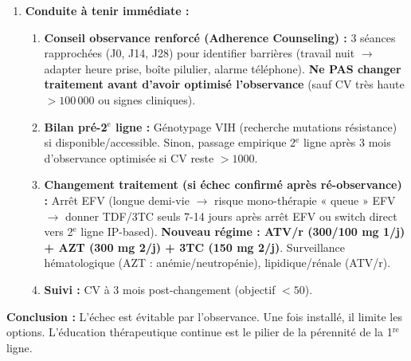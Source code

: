 \documentclass[11pt]{article}
\begin{document}
\begin{exoresolu}
\begin{enumerate}
\begin{itemize}
        \item \textbf{Conséquence 2$^{\text{e}}$ ligne :} \textbf{Impossible de réutiliser un NNRTI (EFV/NVP)}. La 2$^{\text{e}}$ ligne OMS standard repose sur un \textbf{IP (Inhibiteur de Protéase) boosté au Ritonavir (ATV/r ou LPV/r) ou DTG (Inhibiteur Intégrase)} + 2 INRTI (souvent AZT + 3TC ou TDF + 3TC si M184V seul). Au Cameroun : \textbf{ATV/r (ou LPV/r) + AZT + 3TC} est la 2$^{\text{e}}$ ligne de référence si échec sur TDF/3TC/EFV.
    \end{itemize}
    \item \textbf{Conduite à tenir immédiate :}
    \begin{enumerate}
        \item \textbf{Conseil observance renforcé (Adherence Counseling) :} 3 séances rapprochées (J0, J14, J28) pour identifier barrières (travail nuit $\rightarrow$ adapter heure prise, boîte pilulier, alarme téléphone). \textbf{Ne PAS changer traitement avant d'avoir optimisé l'observance} (sauf CV très haute $> 100\,000$ ou signes cliniques).
        \item \textbf{Bilan pré-2$^{\text{e}}$ ligne :} Génotypage VIH (recherche mutations résistance) si disponible/accessible. Sinon, passage empirique 2$^{\text{e}}$ ligne après 3 mois d'observance optimisée si CV reste $> 1000$.
        \item \textbf{Changement traitement (si échec confirmé après ré-observance) :} Arrêt EFV (longue demi-vie $\rightarrow$ risque mono-thérapie « queue » EFV $\rightarrow$ donner TDF/3TC seuls 7-14 jours après arrêt EFV ou switch direct vers 2$^{\text{e}}$ ligne IP-based). \textbf{Nouveau régime : ATV/r (300/100 mg 1/j) + AZT (300 mg 2/j) + 3TC (150 mg 2/j)}. Surveillance hématologique (AZT : anémie/neutropénie), lipidique/rénale (ATV/r).
        \item \textbf{Suivi :} CV à 3 mois post-changement (objectif $< 50$).
    \end{enumerate}
\end{enumerate}
\textbf{Conclusion :} L'échec est évitable par l'observance. Une fois installé, il limite les options. L'éducation thérapeutique continue est le pilier de la pérennité de la 1$^{\text{re}}$ ligne.
\end{exoresolu}
\end{document}
